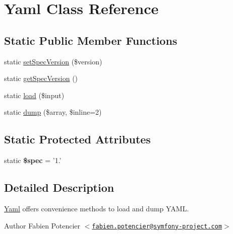 \hypertarget{class_symfony_1_1_component_1_1_yaml_1_1_yaml}{
\section{\-Yaml \-Class \-Reference}
\label{class_symfony_1_1_component_1_1_yaml_1_1_yaml}
}
\subsection*{\-Static \-Public \-Member \-Functions}
\begin{DoxyCompactItemize}
\item 
static \hyperlink{class_symfony_1_1_component_1_1_yaml_1_1_yaml_a864e42e0c0857cf55be1ec4f008edc3b}{set\-Spec\-Version} (\$version)
\item 
static \hyperlink{class_symfony_1_1_component_1_1_yaml_1_1_yaml_a85e91f9d5d0fe9f3cc335c1b3e7bf8c1}{get\-Spec\-Version} ()
\item 
static \hyperlink{class_symfony_1_1_component_1_1_yaml_1_1_yaml_ae9c877233944ff7dc1a24e61895c25a0}{load} (\$input)
\item 
static \hyperlink{class_symfony_1_1_component_1_1_yaml_1_1_yaml_a7316b7295161b4744e2817b2b65b29f9}{dump} (\$array, \$inline=2)
\end{DoxyCompactItemize}
\subsection*{\-Static \-Protected \-Attributes}
\begin{DoxyCompactItemize}
\item 
\hypertarget{class_symfony_1_1_component_1_1_yaml_1_1_yaml_a6fef0dc9bb3b676cb3717c2241685ca8}{
static {\bfseries \$spec} = '1.'}
\label{class_symfony_1_1_component_1_1_yaml_1_1_yaml_a6fef0dc9bb3b676cb3717c2241685ca8}

\end{DoxyCompactItemize}


\subsection{\-Detailed \-Description}
\hyperlink{class_symfony_1_1_component_1_1_yaml_1_1_yaml}{\-Yaml} offers convenience methods to load and dump \-Y\-A\-M\-L.

\begin{DoxyAuthor}{\-Author}
\-Fabien \-Potencier $<$\href{mailto:fabien.potencier@symfony-project.com}{\tt fabien.\-potencier@symfony-\/project.\-com}$>$ 
\end{DoxyAuthor}


